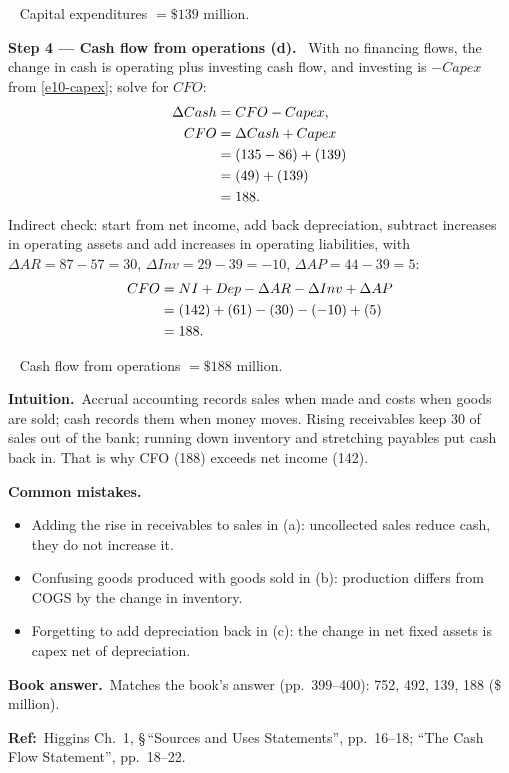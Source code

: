 \documentclass[11pt,a4paper]{article}
\newcommand{\step}[2]{\par\medskip\noindent\textbf{Step #1 --- #2.}~}
\newcommand{\intuition}{\par\medskip\noindent\textbf{Intuition.}~}
\newcommand{\bookans}{\par\medskip\noindent\textbf{Book answer.}~}
\newcommand{\refbib}{\par\smallskip\noindent\textbf{Ref:}~}
\newcommand{\answer}[1]{\par\smallskip\noindent\fbox{\textbf{Answer #1.}}~}
\newcommand{\pitfalls}{\par\medskip\noindent\textbf{Common mistakes.}}
\begin{document}
\answer{(c)} Capital expenditures $= \$139$ million.

\step{4}{Cash flow from operations (d)}
With no financing flows, the change in cash is operating plus investing cash flow, and investing
is $-Capex$ from \eqref{e10-capex}; solve for $CFO$:
\begin{align}
  \Delta Cash &= CFO - Capex, \notag\\
  CFO &= \Delta Cash + Capex \notag\\
  &= (135 - 86) + (139) \notag\\
  &= (49) + (139) \notag\\
  &= 188. \label{e10-cfo}
\end{align}
Indirect check: start from net income, add back depreciation, subtract increases in operating
assets and add increases in operating liabilities, with $\Delta AR = 87 - 57 = 30$,
$\Delta Inv = 29 - 39 = -10$, $\Delta AP = 44 - 39 = 5$:
\begin{align}
  CFO &= NI + Dep - \Delta AR - \Delta Inv + \Delta AP \notag\\
  &= (142) + (61) - (30) - (-10) + (5) \notag\\
  &= 188. \notag
\end{align}

\answer{(d)} Cash flow from operations $= \$188$ million.

\intuition Accrual accounting records sales when made and costs when goods are sold; cash
records them when money moves. Rising receivables keep 30 of sales out of the bank; running down
inventory and stretching payables put cash back in. That is why CFO (188) exceeds net income (142).

\pitfalls
\begin{itemize}
  \item Adding the rise in receivables to sales in (a): uncollected sales reduce cash, they do not increase it.
  \item Confusing goods produced with goods sold in (b): production differs from COGS by the change in inventory.
  \item Forgetting to add depreciation back in (c): the change in net fixed assets is capex net of depreciation.
\end{itemize}

\bookans Matches the book's answer (pp.~399--400): 752, 492, 139, 188 (\$ million).

\refbib Higgins Ch.~1, \S\,``Sources and Uses Statements'', pp.~16--18; ``The Cash Flow
Statement'', pp.~18--22.
\end{document}
